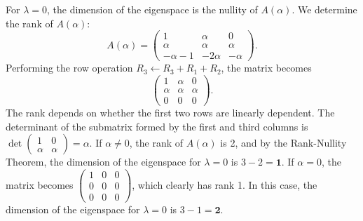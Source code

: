 \documentclass{article}
\begin{document}
\begin{enumerate}[label=\fbox{\arabic*}]
        For $\lambda = 0$, the dimension of the eigenspace is the nullity of $A(\alpha)$. We determine the rank of $A(\alpha)$:
        \[
          A(\alpha) = \begin{pmatrix} 1 & \alpha & 0 \\ \alpha & \alpha & \alpha \\ -\alpha - 1 & -2\alpha & -\alpha \end{pmatrix}.
        \]
        Performing the row operation $R_3 \leftarrow R_3 + R_1 + R_2$, the matrix becomes
        \[
          \begin{pmatrix} 1 & \alpha & 0 \\ \alpha & \alpha & \alpha \\ 0 & 0 & 0 \end{pmatrix}.
        \]
        The rank depends on whether the first two rows are linearly dependent. 
        The determinant of the submatrix formed by the first and third columns is $\det \begin{pmatrix} 1 & 0 \\ \alpha & \alpha \end{pmatrix} = \alpha$.
        If $\alpha \neq 0$, the rank of $A(\alpha)$ is 2, and by the Rank-Nullity Theorem, the dimension of the eigenspace for $\lambda = 0$ is $3 - 2 = \mathbf{1}$.
        If $\alpha = 0$, the matrix becomes $\begin{pmatrix} 1 & 0 & 0 \\ 0 & 0 & 0 \\ 0 & 0 & 0 \end{pmatrix}$, which clearly has rank 1. In this case, the dimension of the eigenspace for $\lambda = 0$ is $3 - 1 = \mathbf{2}$.


\end{enumerate}
\end{document}
